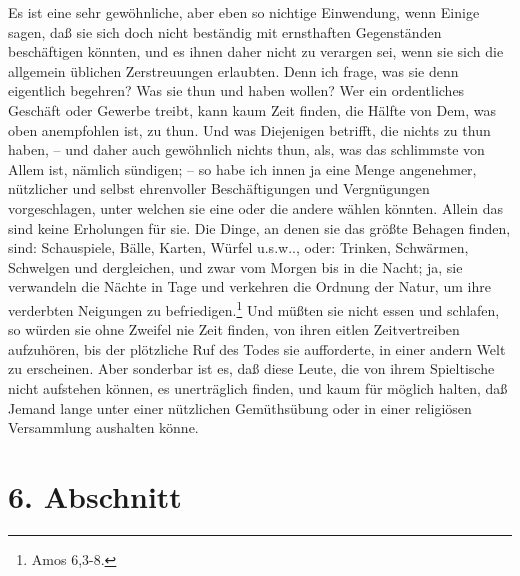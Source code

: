 Es ist eine sehr gewöhnliche, aber eben so nichtige Einwendung, wenn Einige
sagen, daß sie sich doch nicht beständig mit ernsthaften Gegenständen
beschäftigen könnten, und es ihnen daher nicht zu verargen sei, wenn sie sich
die allgemein üblichen Zerstreuungen erlaubten. Denn ich frage, was sie denn
eigentlich begehren? Was sie thun und haben wollen? Wer ein ordentliches
Geschäft oder Gewerbe treibt, kann kaum Zeit finden, die Hälfte von Dem, was
oben anempfohlen ist, zu thun. Und was Diejenigen betrifft, die nichts zu thun
haben, -- und daher auch gewöhnlich nichts thun, als, was das schlimmste von
Allem ist, nämlich sündigen; -- so habe ich innen ja eine Menge angenehmer,
nützlicher und selbst ehrenvoller Beschäftigungen und Vergnügungen
vorgeschlagen, unter welchen sie eine oder die andere wählen könnten. Allein das
sind keine Erholungen für sie. Die Dinge, an denen sie das größte Behagen
finden, sind: Schauspiele, Bälle, Karten, Würfel u.s.w.., oder: Trinken,
Schwärmen, Schwelgen und dergleichen, und zwar vom Morgen bis in die Nacht; ja,
sie verwandeln die Nächte in Tage und verkehren die Ordnung der Natur, um ihre
verderbten Neigungen zu befriedigen.\footnote{Amos 6,3-8.} Und müßten sie nicht
essen und schlafen, so würden sie ohne Zweifel nie Zeit finden, von ihren eitlen
Zeitvertreiben aufzuhören, bis der plötzliche Ruf des Todes sie aufforderte, in
einer andern Welt zu erscheinen. Aber sonderbar ist es, daß diese Leute, die von
ihrem Spieltische nicht aufstehen können, es unerträglich finden, und kaum für
möglich halten, daß Jemand lange unter einer nützlichen Gemüthsübung oder in
einer religiösen Versammlung aushalten könne.

\section{6. Abschnitt}

